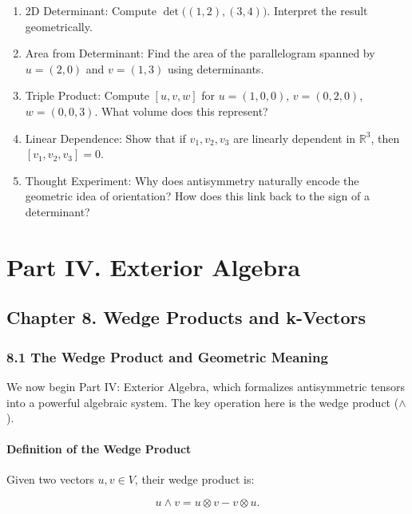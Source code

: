 \documentclass[
  letterpaper,
  DIV=11,
  numbers=noendperiod]{scrreprt}
\begin{document}
\begin{enumerate}
\def\labelenumi{\arabic{enumi}.}
\item
  2D Determinant: Compute \(\det\big((1,2),(3,4)\big)\). Interpret the
  result geometrically.
\item
  Area from Determinant: Find the area of the parallelogram spanned by
  \(u=(2,0)\) and \(v=(1,3)\) using determinants.
\item
  Triple Product: Compute \([u,v,w]\) for \(u=(1,0,0)\), \(v=(0,2,0)\),
  \(w=(0,0,3)\). What volume does this represent?
\item
  Linear Dependence: Show that if \(v_1, v_2, v_3\) are linearly
  dependent in \(\mathbb{R}^3\), then \([v_1,v_2,v_3] = 0\).
\item
  Thought Experiment: Why does antisymmetry naturally encode the
  geometric idea of orientation? How does this link back to the sign of
  a determinant?
\end{enumerate}


\chapter{Part IV. Exterior Algebra}\label{part-iv.-exterior-algebra}

\section{Chapter 8. Wedge Products and
k-Vectors}\label{chapter-8.-wedge-products-and-k-vectors}

\subsection{8.1 The Wedge Product and Geometric
Meaning}\label{the-wedge-product-and-geometric-meaning}

We now begin Part IV: Exterior Algebra, which formalizes antisymmetric
tensors into a powerful algebraic system. The key operation here is the
wedge product (\(\wedge\)).

\subsubsection{Definition of the Wedge
Product}\label{definition-of-the-wedge-product}

Given two vectors \(u, v \in V\), their wedge product is:

\[
u \wedge v = u \otimes v - v \otimes u.
\]
\end{document}
